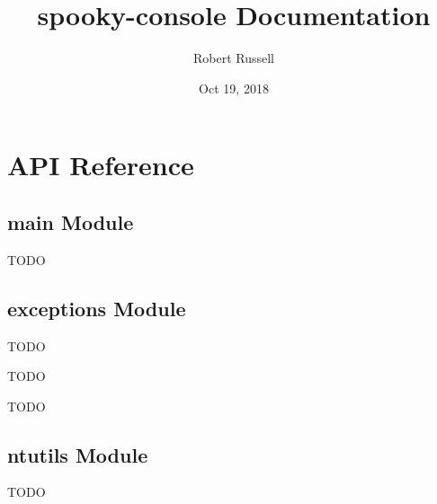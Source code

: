 \documentclass[letterpaper,10pt,english,openany,oneside]{sphinxmanual}
\title{spooky-console Documentation}
\date{Oct 19, 2018}
\author{Robert Russell}
\begin{document}
\pagestyle{empty}
\maketitle
\pagestyle{plain}
\sphinxtableofcontents
\pagestyle{normal}
\label{\detokenize{index::doc}}



\chapter{API Reference}
\label{\detokenize{api:api-reference}}\label{\detokenize{api::doc}}

\section{main Module}
\label{\detokenize{api:module-main}}\label{\detokenize{api:main-module}}
TODO


\section{exceptions Module}
\label{\detokenize{api:module-spookyconsole.exceptions}}\label{\detokenize{api:exceptions-module}}
TODO

\begin{fulllineitems}
\label{\detokenize{api:spookyconsole.exceptions.AbortPromptLoop}}
TODO

\end{fulllineitems}


\begin{fulllineitems}
\label{\detokenize{api:spookyconsole.exceptions.TableFormatError}}
TODO

\end{fulllineitems}



\section{ntutils Module}
\label{\detokenize{api:module-spookyconsole.ntutils}}\label{\detokenize{api:ntutils-module}}
TODO
\end{document}
